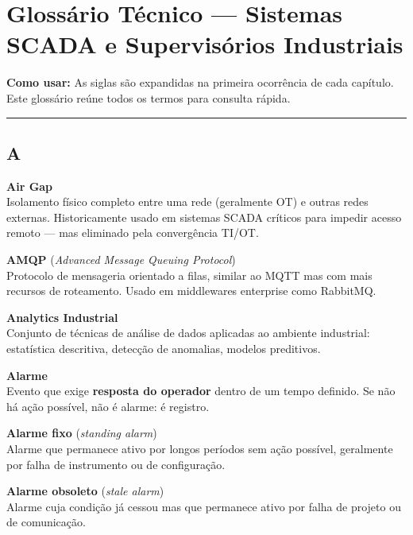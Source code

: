 \chapter{\texorpdfstring{Glossário Técnico --- Sistemas SCADA e Supervisórios Industriais}{Glossário Técnico  Sistemas SCADA e Supervisórios Industriais}}\label{glossuxe1rio-tuxe9cnico-sistemas-scada-e-supervisuxf3rios-industriais}

\begin{caixanota}

\textbf{Como usar:} As siglas são expandidas na primeira ocorrência de cada capítulo. Este glossário reúne todos os termos para consulta rápida.

\end{caixanota}

\begin{center}\rule{0.5\linewidth}{0.5pt}\end{center}

\section{A}\label{a}

\textbf{Air Gap}\\
Isolamento físico completo entre uma rede (geralmente OT) e outras redes externas. Historicamente usado em sistemas SCADA críticos para impedir acesso remoto --- mas eliminado pela convergência TI/OT.

\textbf{AMQP} (\emph{Advanced Message Queuing Protocol})\\
Protocolo de mensageria orientado a filas, similar ao MQTT mas com mais recursos de roteamento. Usado em middlewares enterprise como RabbitMQ.

\textbf{Analytics Industrial}\\
Conjunto de técnicas de análise de dados aplicadas ao ambiente industrial: estatística descritiva, detecção de anomalias, modelos preditivos.

\textbf{Alarme}\\
Evento que exige \textbf{resposta do operador} dentro de um tempo definido. Se não há ação possível, não é alarme: é registro.

\textbf{Alarme fixo} (\emph{standing alarm})\\
Alarme que permanece ativo por longos períodos sem ação possível, geralmente por falha de instrumento ou de configuração.

\textbf{Alarme obsoleto} (\emph{stale alarm})\\
Alarme cuja condição já cessou mas que permanece ativo por falha de projeto ou de comunicação.

